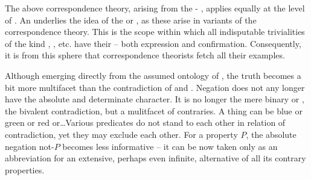 \label{pa:truthB}
The above correspondence theory, arising from the -
, applies equally at the level of . An  underlies the idea of the  or , as
these arise in variants of the correspondence theory. This is the scope within
which all indisputable trivialities of the kind , , etc.  have their  -- both expression and
confirmation. Consequently, it is from this sphere that correspondence theorists
fetch all their  examples.

Although emerging directly from the assumed ontology of , the truth
becomes a bit more multifacet than the contradiction of  and .
Negation does not any longer have the absolute and determinate character.  It is
no longer the mere binary  or , the bivalent contradiction, but
a mulitfacet  of contraries.  A thing can be blue or green or red
or\ldots Various predicates do not stand to each other in relation of
contradiction, yet they may exclude each other.  For a property $P$, the
absolute negation not-$P$ becomes less informative -- it can be now taken only
as an abbreviation for an extensive, perhaps even infinite, alternative of all
its contrary properties.


